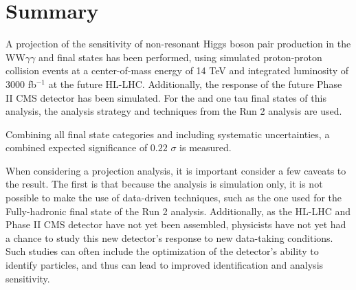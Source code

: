 \section{Summary} \label{sec:Phase_II_Summary}

A projection of the sensitivity of non-resonant Higgs boson pair production in the WW$\gamma\gamma$ and \ttgg final states has been performed, using simulated proton-proton collision events at a center-of-mass energy of 14 TeV and integrated luminosity of 3000 fb$^{-1}$ at the future HL-LHC. Additionally, the response of the future Phase II CMS detector has been simulated. For the \wwgg and one tau \ttgg final states of this analysis, the analysis strategy and techniques from the Run 2 \wwgg analysis are used. 

Combining all final state categories and including systematic uncertainties, a combined expected significance of $0.22$ $\sigma$ is measured.

When considering a projection analysis, it is important consider a few caveats to the result. The first is that because the analysis is simulation only, it is not possible to make the use of data-driven techniques, such as the one used for the Fully-hadronic final state of the Run 2 \wwgg analysis. Additionally, as the HL-LHC and Phase II CMS detector have not yet been assembled, physicists have not yet had a chance to study this new detector's response to new data-taking conditions. Such studies can often include the optimization of the detector's ability to identify particles, and thus can lead to improved identification and analysis sensitivity. 

